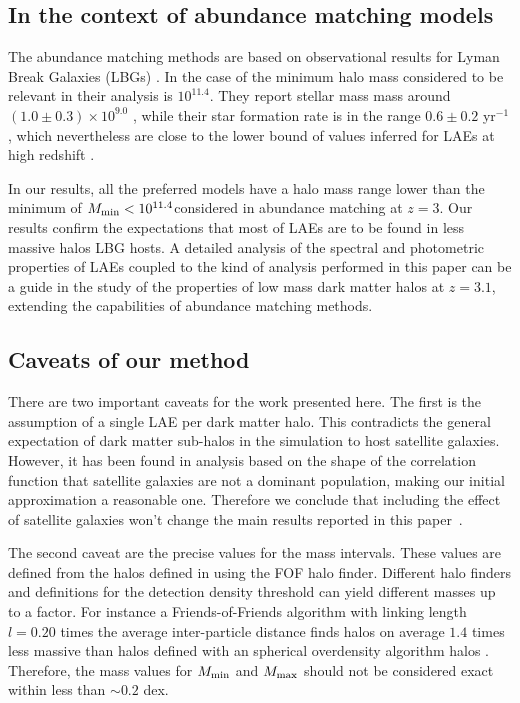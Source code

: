 \documentclass[usenatbib]{mn2e}
\newcommand{\documentname}{paper~}
\newcommand{\hMsun}{{\ifmmode{h^{-1}{\rm
        {M_{\odot}}}}\else{$h^{-1}{\rm{M_{\odot}}}$}\fi}}
\newcommand{\Msun}{{\ifmmode{{\rm {M_{\odot}}}}\else{${\rm{M_{\odot}}}$}\fi}}
\begin{document}
\subsection{In the context of abundance matching models}

The abundance matching methods are based on observational results for
Lyman Break Galaxies (LBGs) \citep{Behroozi2013a,Behroozi2013b}.  In
the case of \cite{Behroozi2013a} the minimum halo mass considered to
be relevant in their analysis is $10^{11.4}$\hMsun. They report
stellar mass mass around $(1.0\pm0.3)\times 10^{9.0}$ \hMsun, while
their star formation rate is in the range $0.6\pm 0.2$ \Msun yr$^{-1}$,
which nevertheless are close to the lower bound of values inferred for
LAEs at high redshift \citep{Gawiser2007,Nilsson2009,Pentericci2009}. 

In our results, all the preferred models have a halo mass range lower
than the minimum of $M_{\rm min}<10^{11.4}$\hMsun considered in
abundance matching at $z=3$. Our results confirm the expectations
that most of  LAEs are to be found in less massive halos LBG hosts. A
detailed analysis of the spectral and photometric properties of LAEs
coupled to the kind of analysis performed in this paper can be a guide
in the study of the properties of low mass dark matter halos at
$z=3.1$, extending the capabilities of abundance matching methods.

\subsection{Caveats of our method}

There are two important caveats for the work presented here. The first is the
assumption of a single LAE per dark matter halo. This contradicts the
general expectation of dark matter sub-halos in the simulation to host
satellite galaxies. However, it has been found in analysis based on
the shape of the correlation function \citep{Jose2013b} that satellite
galaxies are not a dominant population, making our initial
approximation a reasonable one. Therefore we conclude that including
the effect of satellite galaxies won't change the main results
reported in this \documentname.

The second caveat are the precise values for the mass intervals. These
values are defined from the halos defined in using the FOF halo
finder. Different halo finders and definitions for the detection
density threshold can yield different masses up to a factor. For
instance a Friends-of-Friends algorithm with linking length $l=0.20$
times the average inter-particle distance finds halos on average $1.4$
times less massive than halos defined  with an spherical overdensity
algorithm halos \citep{Bolshoi}. Therefore, the mass values for
$M_{\rm min}$ and $M_{\rm max}$ should not be considered exact within
less than $\sim 0.2$ dex.  
\end{document}
